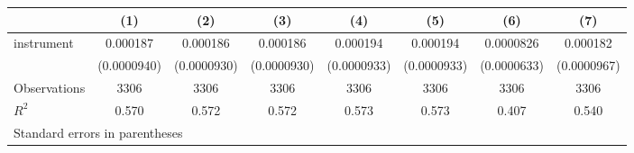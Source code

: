 \begin{tabular}{l*{7}{c}}
\toprule
                &\multicolumn{1}{c}{(1)}&\multicolumn{1}{c}{(2)}&\multicolumn{1}{c}{(3)}&\multicolumn{1}{c}{(4)}&\multicolumn{1}{c}{(5)}&\multicolumn{1}{c}{(6)}&\multicolumn{1}{c}{(7)}\\
\midrule
instrument      & 0.000187& 0.000186& 0.000186& 0.000194& 0.000194&0.0000826& 0.000182\\
                &(0.0000940)&(0.0000930)&(0.0000930)&(0.0000933)&(0.0000933)&(0.0000633)&(0.0000967)\\
\midrule
Observations    &     3306&     3306&     3306&     3306&     3306&     3306&     3306\\
\(R^{2}\)       &    0.570&    0.572&    0.572&    0.573&    0.573&    0.407&    0.540\\
\bottomrule
\multicolumn{8}{l}{\footnotesize Standard errors in parentheses}\\
\end{tabular}
